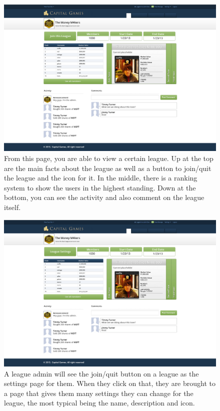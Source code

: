 \begin{figure}
\centering
\includegraphics[width=5.5in]{./mockups/JPEG/Leaguesthird.jpg}
\caption{From this page, you are able to view a certain league. Up at the top are the main facts about the league as well as a button to join/quit the league and the icon for it. In the middle, there is a ranking system to show the users in the highest standing. Down at the bottom, you can see the activity and also comment on the league itself.}
\end{figure}


\begin{figure}
\centering
\includegraphics[width=5.5in]{./mockups/JPEG/Leaguesadmin.jpg}
\caption{A league admin will see the join/quit button on a league as the settings page for them. When they click on that, they are brought to a page that gives them many settings they can change for the league, the most typical being the name, description and icon.}
\end{figure}


